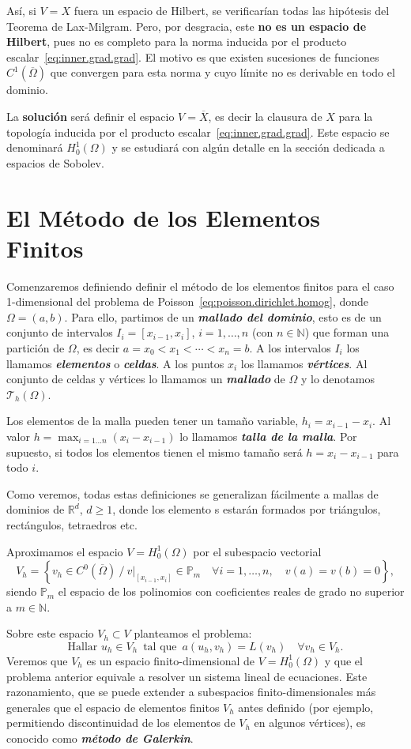\documentclass[11pt]{report}
\theoremstyle{plain}
\theoremstyle{definition}
\newcommand{\deff}[1]{\textit{\textbf{#1}}}
\newcommand{\N}{\ensuremath{\mathbb{N}}}
\newcommand{\R}{\ensuremath{\mathbb{R}}}
\renewcommand{\P}{\ensuremath{\mathbb{P}}}
\begin{document}
Así, si $V=X$ fuera un espacio de Hilbert, se verificarían todas las hipótesis del Teorema de Lax-Milgram. Pero, por desgracia, este \textbf{no es un espacio de Hilbert}, pues no es completo para la norma inducida por el producto escalar~\eqref{eq:inner.grad.grad}. El motivo es que existen sucesiones de funciones $C^1(\overline\Omega)$ que convergen para esta norma y cuyo límite no es derivable en todo el dominio.

La \textbf{solución} será definir el espacio $V=\overline{X}$, es decir la clausura de $X$ para la topología inducida por el producto escalar~\eqref{eq:inner.grad.grad}. Este espacio se denominará $H^1_0(\Omega)$ y se estudiará con algún detalle en la sección dedicada a espacios de Sobolev.


\chapter{El Método de los Elementos Finitos}

Comenzaremos definiendo definir el método de los elementos finitos para el caso 1-di\-men\-sio\-nal del problema de Poisson~\eqref{eq:poisson.dirichlet.homog}, donde $\Omega=(a,b)$. Para ello, partimos de un \deff{mallado del dominio}, esto es de un conjunto de intervalos $I_i=[x_{i-1},x_i]$, $i=1,\dots,n$ (con $n\in\N$) que forman una partición de $\Omega$, es decir $a=x_0<x_1<\cdots<x_n=b$. 
A los intervalos $I_i$ los llamamos \deff{elementos} o \deff{celdas}. A los puntos $x_i$ los llamamos \deff{vértices}. Al conjunto de celdas y vértices lo llamamos un \deff{mallado} de $\Omega$ y lo denotamos $\mathcal{T}_h(\Omega)$. 

Los elementos de la malla pueden tener un tamaño variable, $h_i=x_{i-1}-x_i$. Al valor $h=\max_{i=1\dots n}(x_i-x_{i-1})$ lo llamamos \deff{talla de la malla}. Por supuesto, si todos los elementos tienen el mismo tamaño será $h=x_i-x_{i-1}$ para todo $i$.

Como veremos, todas estas definiciones se generalizan fácilmente a mallas de dominios de $\R^d$, $d\ge 1$, donde los elemento s estarán formados  por triángulos, rectángulos, tetraedros etc.

Aproximamos el espacio $V=H_0^1(\Omega)$ por el subespacio vectorial
\[
  V_h = \left\{ v_h\in C^0(\overline\Omega) \ /\ v|_{[x_{i-1},x_i]}\in\P_m \quad \forall i=1,\dots,n, \quad v(a)=v(b)=0 \right\},
\]
siendo $\P_m$ el espacio de los polinomios con coeficientes reales de grado no superior a $m\in\N$. 


Sobre este espacio $V_h\subset V$ planteamos el problema:
\begin{equation}
  \label{eq:problema.elementos-finitos.1d}
  \text{Hallar }u_h\in V_h  \enspace\text{tal que} \enspace
  a(u_h,v_h) = L(v_h) \quad \forall v_h\in V_h.
\end{equation}
Veremos que $V_h$ es un espacio finito-dimensional de $V=H_0^1(\Omega)$ y que el problema anterior equivale a resolver un sistema lineal de ecuaciones. Este razonamiento, que se puede extender a subespacios finito-dimensionales más generales que el espacio de elementos finitos $V_h$ antes definido (por ejemplo, permitiendo discontinuidad de los elementos de $V_h$ en algunos vértices), es conocido como \deff{método de Galerkin}.
\end{document}

